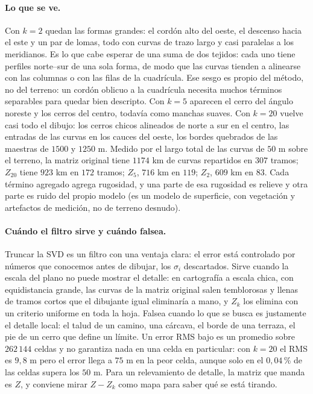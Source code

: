 \paragraph{Lo que se ve.} Con \(k=2\) quedan las formas grandes: el cordón alto del oeste, el
descenso hacia el este y un par de lomas, todo con curvas de trazo largo y casi paralelas a
los meridianos. Es lo que cabe esperar de una suma de dos tejidos: cada uno tiene perfiles
norte--sur de una sola forma, de modo que las curvas tienden a alinearse con las columnas o con
las filas de la cuadrícula. Ese sesgo es propio del método, no del terreno: un cordón oblicuo a la
cuadrícula necesita muchos términos separables para quedar bien descripto. Con \(k=5\) aparecen
el cerro del ángulo noreste y los cerros del centro, todavía como manchas suaves. Con
\(k=20\) vuelve casi todo el dibujo: los cerros chicos alineados de norte a sur en el centro,
las entradas de las curvas en los cauces del oeste, los bordes quebrados de las maestras de
\(1500\) y \(1250\) m. Medido por el largo total de las curvas
de \(50\) m sobre el terreno, la matriz original tiene \(1174\) km de curvas repartidos en
\(307\) tramos; \(Z_{20}\) tiene \(923\) km en \(172\) tramos; \(Z_5\), \(716\) km en
\(119\); \(Z_2\), \(609\) km en \(83\). Cada término agregado agrega rugosidad, y una parte
de esa rugosidad es relieve y otra parte es ruido del propio modelo (es un modelo de superficie,
con vegetación y artefactos de medición, no de terreno desnudo).

\paragraph{Cuándo el filtro sirve y cuándo falsea.} Truncar la SVD es un filtro con una
ventaja clara: el error está controlado por números que conocemos antes de dibujar, los
\(\sigma_i\) descartados. Sirve cuando la escala del plano no puede mostrar el detalle: en
cartografía a escala chica, con equidistancia grande, las curvas de la matriz original salen
temblorosas y llenas de tramos cortos que el dibujante igual eliminaría a mano, y \(Z_k\) los
elimina con un criterio uniforme en toda la hoja. Falsea cuando lo que se busca es justamente
el detalle local: el talud de un camino, una cárcava, el borde de una terraza, el pie de un
cerro que define un límite. Un error RMS bajo es un promedio sobre \(262\,144\) celdas y no
garantiza nada en una celda en particular: con \(k=20\) el RMS es \(9{,}8\) m pero el error
llega a \(75\) m en la peor celda, aunque solo en el \(0{,}04\)\,\% de las celdas supera los
\(50\) m. Para un relevamiento de detalle, la matriz que manda es \(Z\), y conviene mirar
\(Z-Z_k\) como mapa para saber qué se está tirando.

